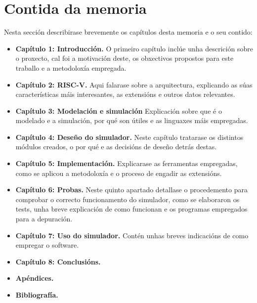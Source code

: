 \section{Contida da memoria}
\label{sec:contido_memoria}
Nesta sección describirase brevemente os capítulos desta memoria e o seu contido: 
\begin{itemize}
    \item \textbf{Capítulo 1: Introducción.}  O primeiro capítulo inclúe unha descrición sobre o proxecto, cal foi a motivación deste, os obxectivos propostos para este traballo e a metodoloxía empregada.
    \item \textbf{Capítulo 2: RISC-V.} Aqui falarase sobre a arquitectura, explicando as súas características máis interesantes, as extensións e outros datos relevantes.
    \item \textbf{Capítulo 3: Modelación e simulación} Explicación sobre que é o modelado e a simulación, por qué son útiles e as linguaxes máis empregadas.
    \item \textbf{Capítulo 4: Deseño do simulador.} Neste capítulo tratarase os distintos módulos creados, o por qué e as decisións de deseño detrás destas.
    \item \textbf{Capítulo 5: Implementación.} Explicarase as ferramentas empregadas, como se aplicou a metodoloxía e o proceso de engadir as extensións.
    \item \textbf{Capítulo 6: Probas.} Neste quinto apartado detallase o procedemento para comprobar o correcto funcionamento do simulador, como se elaboraron os tests, unha breve explicación de como funcionan e os programas empregados para a depuración.
    \item \textbf{Capítulo 7: Uso do simulador.} Contén unhas breves indicacións de como empregar o software.
    \item \textbf{Capítulo 8: Conclusións.}
    \item \textbf{Apéndices. }
    \item \textbf{Bibliografía. }
    
\end{itemize}

